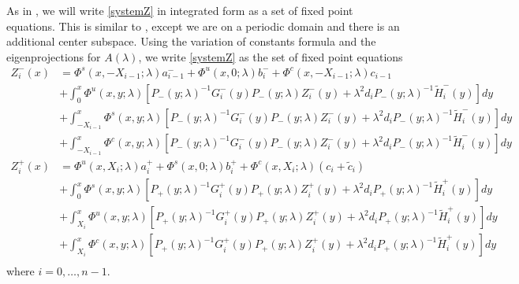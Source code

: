 \documentclass[thesis.tex]{subfiles}
\begin{document}
As in \cite{Sandstede1998}, we will write \eqref{systemZ} in integrated form as a set of fixed point equations. This is similar to \cite[(3.14)]{Sandstede1998}, except we are on a periodic domain and there is an additional center subspace. Using the variation of constants formula and the eigenprojections for $A(\lambda)$, we write \eqref{systemZ} as the set of fixed point equations
\begin{equation}\label{Zfpeq}
\begin{aligned}
Z_i^-(x) &= \Phi^s(x, -X_{i-1}; \lambda) a_{i-1}^- + \Phi^u(x, 0; \lambda) b_i^- + \Phi^c(x, -X_{i-1}; \lambda) c_{i-1} \\
&+ \int_0^x \Phi^u(x, y; \lambda)[P_-(y; \lambda)^{-1} G_i^-(y) P_-(y; \lambda)Z_i^-(y) + \lambda^2 d_i P_-(y; \lambda)^{-1} \tilde{H}_i^-(y)] dy \\
&+ \int_{-X_{i-1}}^x \Phi^s(x, y; \lambda)[P_-(y; \lambda)^{-1} G_i^-(y) P_-(y; \lambda)Z_i^-(y) + \lambda^2 d_i P_-(y; \lambda)^{-1} \tilde{H}_i^-(y)] dy \\
&+ \int_{-X_{i-1}}^x \Phi^c(x, y; \lambda) [P_-(y; \lambda)^{-1} G_i^-(y) P_-(y; \lambda)Z_i^-(y) + \lambda^2 d_i P_-(y; \lambda)^{-1} \tilde{H}_i^-(y)] dy  \\ 
Z_i^+(x) &= \Phi^u(x, X_i; \lambda) a_i^+ + \Phi^s(x, 0; \lambda) b_i^+ + \Phi^c(x, X_i; \lambda)(c_i + \tilde{c}_i) \\
&+ \int_0^x \Phi^s(x, y; \lambda) [P_+(y; \lambda)^{-1} G_i^+(y) P_+(y; \lambda) Z_i^+(y) + \lambda^2 d_i P_+(y; \lambda)^{-1} \tilde{H}_i^+(y)] dy \\
&+ \int_{X_i}^x \Phi^u(x, y; \lambda) [P_+(y; \lambda)^{-1} G_i^+(y) P_+(y; \lambda) Z_i^+(y) + \lambda^2 d_i P_+(y; \lambda)^{-1} \tilde{H}_i^+(y)] dy \\
&+ \int_{X_i}^x \Phi^c(x, y; \lambda) [P_+(y; \lambda)^{-1} G_i^+(y) P_+(y; \lambda) Z_i^+(y) + \lambda^2 d_i P_+(y; \lambda)^{-1} \tilde{H}_i^+(y)] dy \\
\end{aligned}
\end{equation}
where $i = 0, \dots, n-1$. 
\end{document}
